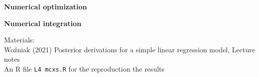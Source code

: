 \documentclass[notes,blackandwhite,mathsans]{beamer}
\begin{document}
{
\begin{frame}

\vspace{1cm} \textbf{\color{mcxs1}Numerical optimization}

\bigskip\textbf{\color{mcxs2}Numerical integration}

%

\bigskip\normalsize Materials:\\ \footnotesize
{\color{mcxs2}Wo\'zniak (2021) Posterior derivations for a simple linear regression model, Lecture notes}\\
{\color{mcxs2}An R file} \texttt{L4 mcxs.R} {\color{mcxs2}for the reproduction the results}

\end{frame}
}





%
%
%
\end{document}

